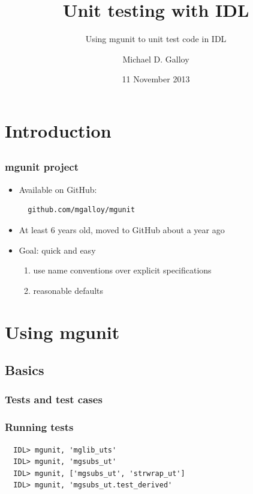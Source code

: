 \documentclass[12pt, handout]{beamer}
\title{Unit testing with IDL}
\subtitle{Using mgunit to unit test code in IDL}
\author{Michael D. Galloy}
\institute[Tech-X Corporation]{Tech-X Corporation\\ Boulder, CO}
\date{11 November 2013}
\begin{document}
\begin{frame}[plain]
  \titlepage
\end{frame}


\section{Introduction}
\subsection*{}

\begin{frame}
  \tableofcontents
\end{frame}

\begin{frame}[t, fragile]
  \frametitle{mgunit project}
  \begin{itemize}
    \item Available on GitHub:

\begin{lstlisting}
  github.com/mgalloy/mgunit
\end{lstlisting}

    \item At least 6 years old, moved to GitHub about a year ago
    \item Goal: quick and easy
    \begin{enumerate}
      \item use name conventions over explicit specifications
      \item reasonable defaults
    \end{enumerate}
  \end{itemize}
\end{frame}


\section{Using mgunit}
\subsection{Basics}

\begin{frame}[t, fragile]
  \frametitle{Tests and test cases}

\end{frame}

\begin{frame}[t, fragile]
  \frametitle{Running tests}

\begin{lstlisting}
  IDL> mgunit, 'mglib_uts'
  IDL> mgunit, 'mgsubs_ut'
  IDL> mgunit, ['mgsubs_ut', 'strwrap_ut']
  IDL> mgunit, 'mgsubs_ut.test_derived'
\end{lstlisting}

\end{frame}
\end{document}
